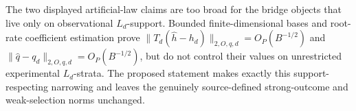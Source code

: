 The two displayed artificial-law claims are too broad for the bridge objects that live only on observational \(L_d\)-support.  Bounded finite-dimensional bases and root-rate coefficient estimation prove \(\|T_d(\widehat h-h_d)\|_{2,O,q,d}=O_P(B^{-1/2})\) and \(\|\widehat q-q_d\|_{2,O,q,d}=O_P(B^{-1/2})\), but do not control their values on unrestricted experimental \(L_d\)-strata.  The proposed statement makes exactly this support-respecting narrowing and leaves the genuinely source-defined strong-outcome and weak-selection norms unchanged.